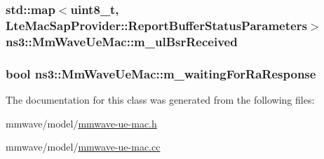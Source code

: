 \subsubsection[{\texorpdfstring{m\+\_\+ul\+Bsr\+Received}{m_ulBsrReceived}}]{\setlength{\rightskip}{0pt plus 5cm}std\+::map$<$uint8\+\_\+t, {\bf Lte\+Mac\+Sap\+Provider\+::\+Report\+Buffer\+Status\+Parameters}$>$ ns3\+::\+Mm\+Wave\+Ue\+Mac\+::m\+\_\+ul\+Bsr\+Received\hspace{0.3cm}{\ttfamily [private]}}\hypertarget{classns3_1_1MmWaveUeMac_a4fedb11c547b798c1546f082e147ba03}{}\label{classns3_1_1MmWaveUeMac_a4fedb11c547b798c1546f082e147ba03}
\subsubsection[{\texorpdfstring{m\+\_\+waiting\+For\+Ra\+Response}{m_waitingForRaResponse}}]{\setlength{\rightskip}{0pt plus 5cm}bool ns3\+::\+Mm\+Wave\+Ue\+Mac\+::m\+\_\+waiting\+For\+Ra\+Response\hspace{0.3cm}{\ttfamily [private]}}\hypertarget{classns3_1_1MmWaveUeMac_ab1cbf9aed2d6c3a74370f5f4fbd68910}{}\label{classns3_1_1MmWaveUeMac_ab1cbf9aed2d6c3a74370f5f4fbd68910}


The documentation for this class was generated from the following files\+:\begin{DoxyCompactItemize}
\item 
mmwave/model/\hyperlink{mmwave-ue-mac_8h}{mmwave-\/ue-\/mac.\+h}\item 
mmwave/model/\hyperlink{mmwave-ue-mac_8cc}{mmwave-\/ue-\/mac.\+cc}\end{DoxyCompactItemize}
